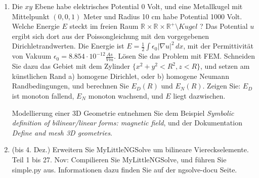 \documentclass[11pt,a4paper]{report}
\newcommand{\R}[1]{\mathbb{R}^{#1}}
\begin{document}
\begin{enumerate}
\item
Die $xy$ Ebene habe elektrisches Potential 0 Volt, und eine Metallkugel
mit Mittelpunkt $(0,0,1)$ Meter und Radius 10 cm habe Potential 1000
Volt. Welche Energie $E$ steckt im freien Raum $\R{} \times \R{} \times
\R{+} \setminus Kugel$ ? Das Potential $u$ ergibt sich dort aus der
Poissongleichung mit den vorgegebenen Dirichletrandwerten. Die Energie
ist $E = \frac12\int
\epsilon_0 | \nabla u |^2 \, dx$, mit der Permittivit\"at von Vakuum
$\epsilon_0 = 8.854 \cdot 10^{-12} \frac{As} {Vm}$. L\"osen Sie das Problem mit FEM. Schneiden
Sie dazu das Gebiet mit dem Zylinder $\{ x^2 + y^2 < R^2, z < R \}$, und
setzen am k\"unstlichen Rand a) homogene Dirichlet, oder b) homogene
Neumann Randbedingungen, und berechnen Sie $E_D(R)$ und $E_N(R)$. 
Zeigen Sie: $E_D$ ist monoton fallend, $E_N$ monoton wachsend, und $E$
liegt dazwischen.

Modellierung einer 3D Geometrie entnehmen Sie dem Beispiel 
{\it Symbolic definition of bilinear/linear forms: magnetic field},
und der Dokumentation {\it Define and mesh 3D geometries}.


\item (bis 4. Dez.) Erweitern Sie MyLittleNGSolve um bilineare
  Viereckselemente. 
Teil 1 bis 27. Nov: Compilieren Sie MyLittleNGSolve, und f\"uhren Sie
simple.py aus.  Informationen dazu finden Sie auf der ngsolve-docu Seite.

\end{enumerate}
\end{document}
